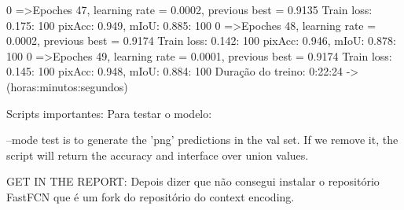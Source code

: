   0%
=>Epoches 47, learning rate = 0.0002,                 previous best = 0.9135
Train loss: 0.175: 100%
pixAcc: 0.949, mIoU: 0.885: 100%
  0%
=>Epoches 48, learning rate = 0.0002,                 previous best = 0.9174
Train loss: 0.142: 100%
pixAcc: 0.946, mIoU: 0.878: 100%
  0%
=>Epoches 49, learning rate = 0.0001,                 previous best = 0.9174
Train loss: 0.145: 100%
pixAcc: 0.948, mIoU: 0.884: 100%
Duração do treino: 0:22:24 -> (horas:minutos:segundos)


\bigskip

Scripts importantes: Para testar o modelo:

--mode test is to generate the 'png' predictions in the val set. If we remove it, the script will return the accuracy and interface over union values.





GET IN THE REPORT:
    Depois dizer que não consegui instalar o repositório FastFCN que é um fork do repositório do context encoding.
    
